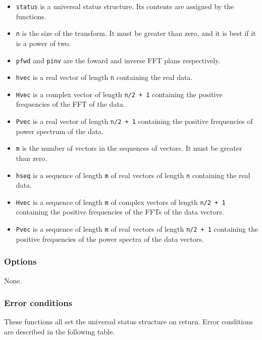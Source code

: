 \documentclass{article}
\begin{document}
\begin{itemize}
\item \texttt{status} is a universal status structure.  Its contents are
assigned by the functions.
\item \texttt{n} is the size of the transform.  It
must be greater than zero, and it is best if it is a power of two.
\item \texttt{pfwd} and \texttt{pinv} are the foward and inverse FFT plans
respectively.
\item \texttt{hvec} is a real vector of length \texttt{n} containing the real
data.
\item \texttt{Hvec} is a complex vector of length \texttt{n/2 + 1} containing
the positive frequencies of the FFT of the data.
\item \texttt{Pvec} is a real vector of length \texttt{n/2 + 1} containing the
positive frequencies of power spectrum of the data.
\item \texttt{m} is the number of vectors in the sequences of vectors.  It
must be greater than zero.
\item \texttt{hseq} is a sequence of length \texttt{m} of real vectors of
length \texttt{n} containing the real data.
\item \texttt{Hvec} is a sequence of length \texttt{m} of complex vectors of
length \texttt{n/2 + 1} containing the positive frequencies of the FFTs of the
data vectors.
\item \texttt{Pvec} is a sequence of length \texttt{m} of real vectors of
length \texttt{n/2 + 1} containing the positive frequencies of the power
spectra of the data vectors.
\end{itemize}

\subsubsection{Options}

None. 

\subsubsection{Error conditions}


These functions all set the universal status structure on return.
Error conditions are described in the following table.
\end{document}
